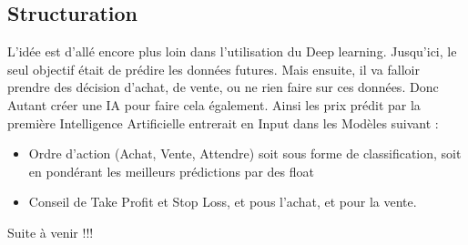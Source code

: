 \documentclass[12pt,a4paper]{article}
\begin{document}
\subsection*{Structuration}
L'idée est d'allé encore plus loin dans l'utilisation du Deep learning. Jusqu'ici, le seul objectif était de prédire les données futures. Mais ensuite, il va falloir prendre des décision d'achat, de vente, ou ne rien faire sur ces données. Donc Autant créer une IA pour faire cela également. Ainsi les prix prédit par la première Intelligence Artificielle entrerait en Input dans les Modèles suivant :
\begin{itemize}
	\item Ordre d'action (Achat, Vente, Attendre) soit sous forme de classification, soit en pondérant les meilleurs prédictions par des float
	\item Conseil de Take Profit et Stop Loss, et pous l'achat, et pour la vente.
\end{itemize}


\begin{huge}
\begin{center}
Suite à venir !!!

\end{center}
\end{huge}
\end{document}
